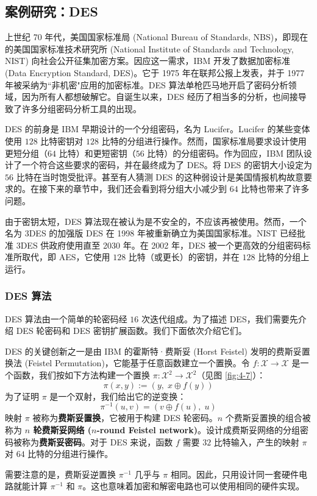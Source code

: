 \subsection{案例研究：DES}\label{subsec:4-2-1}

上世纪 70 年代，美国国家标准局 (National Bureau of Standards, NBS)，即现在的美国国家标准技术研究所 (National Institute of Standards and Technology, NIST) 向社会公开征集加密方案。因应这一需求，IBM 开发了数据加密标准 (Data Encryption Standard, DES)。它于 1975 年在联邦公报上发表，并于 1977 年被采纳为``非机密"应用的加密标准。DES 算法单枪匹马地开启了密码分析领域，因为所有人都想破解它。自诞生以来，DES 经历了相当多的分析，也间接导致了许多分组密码分析工具的出现。

DES 的前身是 IBM 早期设计的一个分组密码，名为 Lucifer。Lucifer 的某些变体使用 $128$ 比特密钥对 $128$ 比特的分组进行操作。然而，国家标准局要求设计使用更短分组（$64$ 比特）和更短密钥（$56$ 比特）的分组密码。作为回应，IBM 团队设计了一个符合这些要求的密码，并在最终成为了 DES。将 DES 的密钥大小设定为 $56$ 比特在当时饱受批评。甚至有人猜测 DES 的这种弱设计是美国情报机构故意要求的。在接下来的章节中，我们还会看到将分组大小减少到 $64$ 比特也带来了许多问题。

由于密钥太短，DES 算法现在被认为是不安全的，不应该再被使用。然而，一个名为 3DES 的加强版 DES 在 1998 年被重新确立为美国国家标准。NIST 已经批准 3DES 供政府使用直至 2030 年。在 2002 年，DES 被一个更高效的分组密码标准所取代，即 AES，它使用 $128$ 比特（或更长）的密钥，并在 $128$ 比特的分组上运行。

\subsubsection{DES 算法}

DES 算法由一个简单的轮密码经 $16$ 次迭代组成。为了描述 DES，我们需要先介绍 DES 轮密码和 DES 密钥扩展函数。我们下面依次介绍它们。

\begin{snote}[费斯妥置换法。]
DES 的关键创新之一是由 IBM 的霍斯特·费斯妥 (Horst Feistel) 发明的费斯妥置换法 (Feistel Permutation)，它能基于任意函数建立一个置换。令 $f:\mathcal{X}\to\mathcal{X}$ 是一个函数，我们按如下方法构建一个置换 $\pi:\mathcal{X}^2\to\mathcal{X}^2$（见图 \ref{fig:4-7}）：
\[
\pi(x,y):=(y,\;x\oplus f(y))
\]
为了证明 $\pi$ 是一个双射，我们给出它的逆变换：
\[
\pi^{-1}(u,v)=(v\oplus f(u),\;u)
\]
映射 $\pi$ 被称为\textbf{费斯妥置换}，它被用于构建 DES 轮密码。$n$ 个费斯妥置换的组合被称为 \textbf{$n$ 轮费斯妥网络 ($n$-round Feistel network)}。设计成费斯妥网络的分组密码被称为\textbf{费斯妥密码}。对于 DES 来说，函数 $f$ 需要 $32$ 比特输入，产生的映射 $\pi$ 对 $64$ 比特的分组进行操作。

需要注意的是，费斯妥逆置换 $\pi^{-1}$ 几乎与 $\pi$ 相同。因此，只用设计同一套硬件电路就能计算 $\pi^{-1}$ 和 $\pi$。这也意味着加密和解密电路也可以使用相同的硬件实现。
\end{snote}

